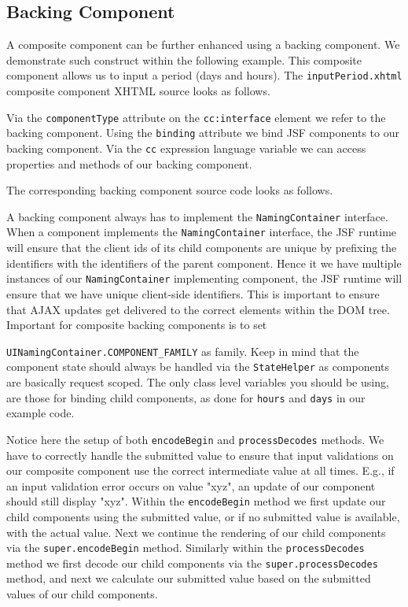 \subsection{Backing Component}
A composite component can be further enhanced using a backing component.
We demonstrate such construct within the following example.
This composite component allows us to input a period (days and hours).
The \texttt{inputPeriod.xhtml} composite component XHTML source looks as follows.

Via the \texttt{componentType} attribute on the \texttt{cc:interface} element we refer to the backing component.
Using the \texttt{binding} attribute we bind JSF components to our backing component.
Via the \texttt{cc} expression language variable we can access properties and methods of our backing component.

The corresponding backing component source code looks as follows.

A backing component always has to implement the \texttt{NamingContainer} interface.
When a component implements the \texttt{NamingContainer} interface, the JSF runtime will ensure that the client ids of its child components are unique by prefixing the identifiers with the identifiers of the parent component.
Hence it we have multiple instances of our \texttt{NamingContainer} implementing component, the JSF runtime will ensure that we have unique client-side identifiers.
This is important to ensure that AJAX updates get delivered to the correct elements within the DOM tree.
Important for composite backing components is to set 

\texttt{UINamingContainer.COMPONENT\_FAMILY} as family.
Keep in mind that the component state should always be handled via the \texttt{StateHelper} as components are basically request scoped.
The only class level variables you should be using, are those for binding child components, as done for \texttt{hours} and \texttt{days} in our example code.

Notice here the setup of both \texttt{encodeBegin} and \texttt{processDecodes} methods.
We have to correctly handle the submitted value to ensure that input validations on our composite component use the correct intermediate value at all times.
E.g., if an input validation error occurs on value "xyz", an update of our component should still display "xyz".
Within the \texttt{encodeBegin} method we first update our child components using the submitted value, or if no submitted value is available, with the actual value.
Next we continue the rendering of our child components via the \texttt{super.encodeBegin} method.
Similarly within the \texttt{processDecodes} method we first decode our child components via the \texttt{super.processDecodes} method, and next we calculate our submitted value based on the submitted values of our child components.

